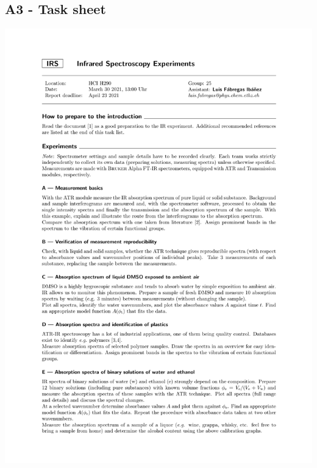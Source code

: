 \documentclass[a4paper,abstracton]{article}	                       %
\begin{document}
\subsection*{A3 - Task sheet}
\includegraphics[page = 1,width=\textwidth]{Task.pdf}
\end{document}
